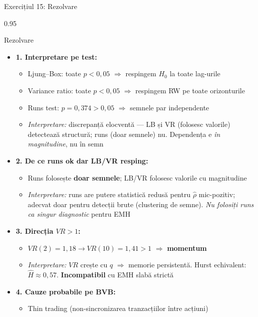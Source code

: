 \documentclass[9pt, aspectratio=169, t]{beamer}
\begin{document}
\begin{frame}[shrink=25]{Exercițiul 15: Rezolvare}
\begin{cminipage}{0.95\textwidth}
\begin{exampleblock}{Rezolvare}
\begin{itemize}\setlength{\itemsep}{0pt}
    \item \textbf{1. Interpretare pe test:}
    \begin{itemize}\setlength{\itemsep}{0pt}
        \item Ljung--Box: toate $p < 0{,}05$ $\Rightarrow$ respingem $H_0$ la toate lag-urile
        \item Variance ratio: toate $p < 0{,}05$ $\Rightarrow$ respingem RW pe toate orizonturile
        \item Runs test: $p = 0{,}374 > 0{,}05$ $\Rightarrow$ semnele par independente
        \item \textit{Interpretare:} discrepanță elocventă --- LB și VR (folosesc valorile) detectează structură; runs (doar semnele) nu. Dependența e \emph{în magnitudine}, nu în semn
    \end{itemize}
    \item \textbf{2. De ce runs ok dar LB/VR resping:}
    \begin{itemize}\setlength{\itemsep}{0pt}
        \item Runs folosește \textbf{doar semnele}; LB/VR folosesc valorile cu magnitudine
        \item \textit{Interpretare:} runs are putere statistică redusă pentru $\hat\rho$ mic-pozitiv; adecvat doar pentru detecții brute (clustering de semne). \emph{Nu folosiți runs ca singur diagnostic} pentru EMH
    \end{itemize}
    \item \textbf{3. Direcția $VR > 1$:}
    \begin{itemize}\setlength{\itemsep}{0pt}
        \item $VR(2) = 1{,}18 \to VR(10) = 1{,}41 > 1$ $\Rightarrow$ \textbf{momentum}
        \item \textit{Interpretare:} $VR$ crește cu $q$ $\Rightarrow$ memorie persistentă. Hurst echivalent: $\hat H \approx 0{,}57$. \textbf{Incompatibil} cu EMH slabă strictă
    \end{itemize}
    \item \textbf{4. Cauze probabile pe BVB:}
    \begin{itemize}\setlength{\itemsep}{0pt}
        \item Thin trading (non-sincronizarea tranzacțiilor între acțiuni)

\end{itemize}
\end{itemize}
\end{exampleblock}
\end{cminipage}
\end{frame}
\end{document}
